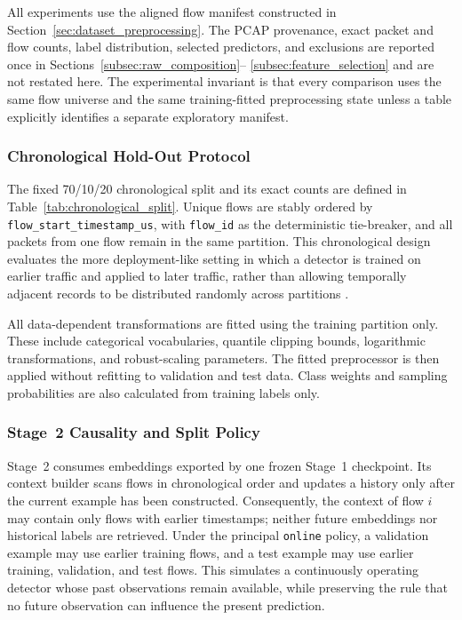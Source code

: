 All experiments use the aligned flow manifest constructed in
Section~\ref{sec:dataset_preprocessing}. The PCAP provenance, exact packet and
flow counts, label distribution, selected predictors, and exclusions are
reported once in Sections~\ref{subsec:raw_composition}--
\ref{subsec:feature_selection} and are not restated here. The experimental
invariant is that every comparison uses the same flow universe and the same
training-fitted preprocessing state unless a table explicitly identifies a
separate exploratory manifest.

\subsubsection{Chronological Hold-Out Protocol}
\label{subsubsec:chronological_holdout}

The fixed 70/10/20 chronological split and its exact counts are defined in
Table~\ref{tab:chronological_split}. Unique flows are stably ordered by
\texttt{flow\_start\_timestamp\_us}, with \texttt{flow\_id} as the
deterministic tie-breaker, and all packets from one flow remain in the same
partition. This chronological design evaluates the more deployment-like
setting in which a detector is trained on earlier traffic and applied to later
traffic, rather than allowing temporally adjacent records to be distributed
randomly across partitions \cite{SommerPaxson2010,Arp2022DosDonts}.

All data-dependent transformations are fitted using the training partition
only. These include categorical vocabularies, quantile clipping bounds,
logarithmic transformations, and robust-scaling parameters. The fitted
preprocessor is then applied without refitting to validation and test data.
Class weights and sampling probabilities are also calculated from training
labels only.

\subsubsection{Stage~2 Causality and Split Policy}
\label{subsubsec:stage2_evaluation_causality}

Stage~2 consumes embeddings exported by one frozen Stage~1 checkpoint. Its
context builder scans flows in chronological order and updates a history only
after the current example has been constructed. Consequently, the context of
flow $i$ may contain only flows with earlier timestamps; neither future
embeddings nor historical labels are retrieved. Under the principal
\texttt{online} policy, a validation example may use earlier training flows,
and a test example may use earlier training, validation, and test flows. This
simulates a continuously operating detector whose past observations remain
available, while preserving the rule that no future observation can influence
the present prediction.

